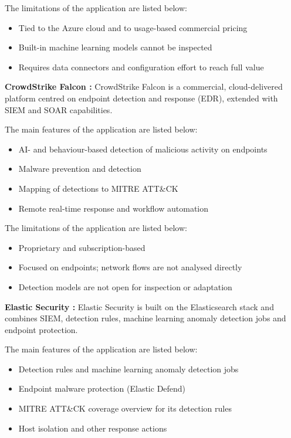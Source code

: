 The limitations of the application are listed below:
\begin{itemize}
    \setlength{\itemsep}{1pt}
    \setlength{\parskip}{0pt}
    \setlength{\parsep}{0pt}
    \item Tied to the Azure cloud and to usage-based commercial pricing
    \item Built-in machine learning models cannot be inspected
    \item Requires data connectors and configuration effort to reach full value
\end{itemize}

\vspace{6pt}
\textbf{CrowdStrike Falcon \cite{crowdstrikefalcon}:} CrowdStrike Falcon is a commercial, cloud-delivered platform centred on endpoint detection and response (EDR), extended with SIEM and SOAR capabilities.

The main features of the application are listed below:
\begin{itemize}
    \setlength{\itemsep}{1pt}
    \setlength{\parskip}{0pt}
    \setlength{\parsep}{0pt}
    \item AI- and behaviour-based detection of malicious activity on endpoints
    \item Malware prevention and detection
    \item Mapping of detections to MITRE ATT\&CK
    \item Remote real-time response and workflow automation
\end{itemize}

The limitations of the application are listed below:
\begin{itemize}
    \setlength{\itemsep}{1pt}
    \setlength{\parskip}{0pt}
    \setlength{\parsep}{0pt}
    \item Proprietary and subscription-based
    \item Focused on endpoints; network flows are not analysed directly
    \item Detection models are not open for inspection or adaptation
\end{itemize}

\vspace{6pt}
\textbf{Elastic Security \cite{elasticsecurity}:} Elastic Security is built on the Elasticsearch stack and combines SIEM, detection rules, machine learning anomaly detection jobs and endpoint protection.

The main features of the application are listed below:
\begin{itemize}
    \setlength{\itemsep}{1pt}
    \setlength{\parskip}{0pt}
    \setlength{\parsep}{0pt}
    \item Detection rules and machine learning anomaly detection jobs
    \item Endpoint malware protection (Elastic Defend)
    \item MITRE ATT\&CK coverage overview for its detection rules
    \item Host isolation and other response actions
\end{itemize}

